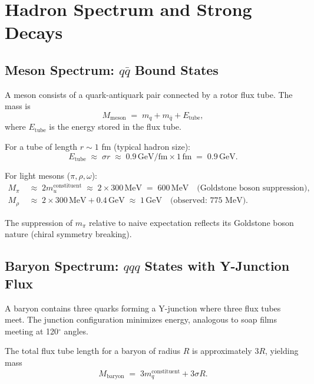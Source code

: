 \documentclass[11pt,a4paper]{article}
\theoremstyle{definition}
\theoremstyle{plain}
\theoremstyle{remark}
\begin{document}
\vspace{1em}

\section{Hadron Spectrum and Strong Decays}
\label{sec:hadron-spectrum}

\subsection{Meson Spectrum: $q\bar{q}$ Bound States}

A meson consists of a quark-antiquark pair connected by a rotor flux tube. The mass is
\begin{equation}
M_{\mathrm{meson}} \;=\; m_q + m_{\bar{q}} + E_{\mathrm{tube}},
\end{equation}
where $E_{\mathrm{tube}}$ is the energy stored in the flux tube.

For a tube of length $r \sim 1$ fm (typical hadron size):
\begin{equation}
E_{\mathrm{tube}} \;\approx\; \sigma r \;\approx\; 0.9\,\text{GeV/fm} \times 1\,\text{fm} \;=\; 0.9\,\text{GeV}.
\end{equation}

For light mesons ($\pi, \rho, \omega$):
\begin{align}
M_\pi &\;\approx\; 2m_u^{\mathrm{constituent}} \;\approx\; 2 \times 300\,\text{MeV} \;=\; 600\,\text{MeV} \quad\text{(Goldstone boson suppression)}, \\
M_\rho &\;\approx\; 2 \times 300\,\text{MeV} + 0.4\,\text{GeV} \;\approx\; 1\,\text{GeV} \quad\text{(observed: 775 MeV)}.
\end{align}

The suppression of $m_\pi$ relative to naive expectation reflects its Goldstone boson nature (chiral symmetry breaking).

\subsection{Baryon Spectrum: $qqq$ States with Y-Junction Flux}

A baryon contains three quarks forming a Y-junction where three flux tubes meet. The junction configuration minimizes energy, analogous to soap films meeting at 120$^\circ$ angles.

The total flux tube length for a baryon of radius $R$ is approximately $3R$, yielding mass
\begin{equation}
M_{\mathrm{baryon}} \;=\; 3m_q^{\mathrm{constituent}} + 3\sigma R.
\end{equation}
\end{document}
